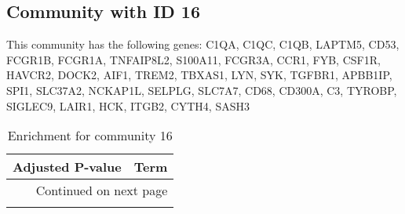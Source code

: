 \subsection*{Community with ID 16}
This community has the following genes: C1QA, C1QC, C1QB, LAPTM5, CD53, FCGR1B, FCGR1A, TNFAIP8L2, S100A11, FCGR3A, CCR1, FYB, CSF1R, HAVCR2, DOCK2, AIF1, TREM2, TBXAS1, LYN, SYK, TGFBR1, APBB1IP, SPI1, SLC37A2, NCKAP1L, SELPLG, SLC7A7, CD68, CD300A, C3, TYROBP, SIGLEC9, LAIR1, HCK, ITGB2, CYTH4, SASH3
\\
\begin{longtable}{p{2.4cm}p{14.5cm}}
\caption{Enrichment for community 16}\\
\toprule
Adjusted \newline P-value &                                                                                                Term \\
\midrule
\endhead
\midrule
\multicolumn{2}{r}{{Continued on next page}} \\
\midrule
\endfoot


\end{longtable}
